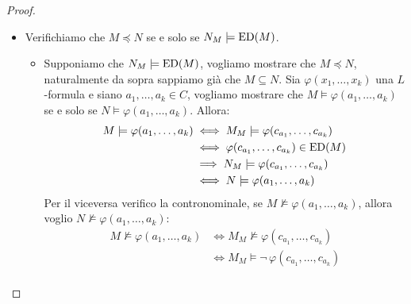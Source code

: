\begin{proof}
\begin{itemize}
\begin{itemize}
\begin{itemize}
                    \begin{align*} M_M \models (t_1=t_2) &\iff (t_1)_{M_M}=(t_2)_{M_M} \\
                                                         &\iff (t_1)_{N_M}=(t_2)_{N_M} \iff N_M \models (t_1=t_2)
                    \end{align*}
                    \item Se \textcolor{MidnightBlue}{$\varphi = \neg\,\psi$} con $\psi$ atomica chiusa, dai due casi precedenti segue $M_M \models \psi \iff N_M \models \psi$, e dunque anche $M_M \models \neg\,\psi \iff N_M \models \neg\,\psi$.
                \end{itemize}
        \end{itemize}
        \item Verifichiamo che $M \preceq N$ se e solo se $N_M \models \operatorname{ED}(M)$.
            \begin{itemize}
                \item[$\boxed{\impliedby}$] Supponiamo che $N_M \models \operatorname{ED}(M)$, vogliamo mostrare che $M \preceq N$, naturalmente da sopra sappiamo già che $M \subseteq N$. Sia $\varphi(x_1, \ldots, x_k)$ una $L$-formula e siano $a_1, \ldots, a_k \in C$, vogliamo mostrare che $M \models \varphi(a_1, \ldots, a_k)$ se e solo se $N \models \varphi(a_1, \ldots, a_k)$. Allora:
                \begin{align*}
                    M \models \varphi(a_1, \ldots, a_k) &\iff M_M \models \varphi(c_{a_1}, \ldots, c_{a_k}) \\
                                                        &\iff \varphi(c_{a_1}, \ldots, c_{a_k}) \in \operatorname{ED}(M) \\
                                                        &\implies N_M \models \varphi(c_{a_1}, \ldots, c_{a_k}) \\
                                                        &\iff N \models \varphi(a_1, \ldots, a_k)
                \end{align*}
                Per il viceversa verifico la contronominale, se $M \not \models \varphi(a_1, \ldots, a_k)$, allora voglio $N \not \models \varphi(a_1, \ldots, a_k)$:
                \begin{align*}
                    M \not \models \varphi(a_1, \ldots, a_k) &\iff M_M \not \models \varphi(c_{a_1}, \ldots, c_{a_k}) \\
                                                             &\iff M_M \models \neg\, \varphi(c_{a_1}, \ldots, c_{a_k}) \\

\end{align*}
\end{itemize}
\end{itemize}
\end{proof}

